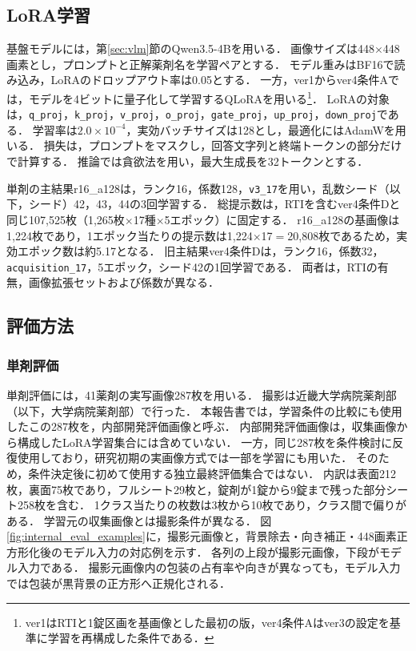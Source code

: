 \documentclass[uplatex,dvipdfmx]{jsarticle}
\begin{document}
\subsection{LoRA学習}

基盤モデルには，第\ref{sec:vlm}節のQwen3.5-4Bを用いる．
画像サイズは448$\times$448画素とし，プロンプトと正解薬剤名を学習ペアとする．
モデル重みはBF16で読み込み，LoRAのドロップアウト率は0.05とする．
一方，ver1からver4条件Aでは，モデルを4ビットに量子化して学習するQLoRAを用いる\footnote{ver1はRTIと1錠区画を基画像とした最初の版，ver4条件Aはver3の設定を基準に学習を再構成した条件である．}．
LoRAの対象は，\texttt{q\_proj}，\texttt{k\_proj}，\texttt{v\_proj}，\texttt{o\_proj}，\texttt{gate\_proj}，\texttt{up\_proj}，\texttt{down\_proj}である．
学習率は$2.0 \times 10^{-4}$，実効バッチサイズは128とし，最適化にはAdamWを用いる．
損失は，プロンプトをマスクし，回答文字列と終端トークンの部分だけで計算する．
推論では貪欲法を用い，最大生成長を32トークンとする．

単剤の主結果r16\_a128は，ランク16，係数128，\texttt{v3\_17}を用い，乱数シード（以下，シード）42，43，44の3回学習する．
総提示数は，RTIを含むver4条件Dと同じ107,525枚（1,265枚$\times$17種$\times$5エポック）に固定する．
r16\_a128の基画像は1,224枚であり，1エポック当たりの提示数は1,224$\times$17$=$20,808枚であるため，実効エポック数は約5.17となる．
旧主結果ver4条件Dは，ランク16，係数32，\texttt{acquisition\_17}，5エポック，シード42の1回学習である．
両者は，RTIの有無，画像拡張セットおよび係数が異なる．

\subsection{評価方法}

\subsubsection{単剤評価}\label{sec:single_eval}

単剤評価には，41薬剤の実写画像287枚を用いる．
撮影は近畿大学病院薬剤部（以下，大学病院薬剤部）で行った．
本報告書では，学習条件の比較にも使用したこの287枚を，内部開発評価画像と呼ぶ．
内部開発評価画像は，収集画像から構成したLoRA学習集合には含めていない．
一方，同じ287枚を条件検討に反復使用しており，研究初期の実画像方式では一部を学習にも用いた．
そのため，条件決定後に初めて使用する独立最終評価集合ではない．
内訳は表面212枚，裏面75枚であり，フルシート29枚と，錠剤が1錠から9錠まで残った部分シート258枚を含む．
1クラス当たりの枚数は3枚から10枚であり，クラス間で偏りがある．
学習元の収集画像とは撮影条件が異なる．
図\ref{fig:internal_eval_examples}に，撮影元画像と，背景除去・向き補正・448画素正方形化後のモデル入力の対応例を示す．
各列の上段が撮影元画像，下段がモデル入力である．
撮影元画像内の包装の占有率や向きが異なっても，モデル入力では包装が黒背景の正方形へ正規化される．
\end{document}
